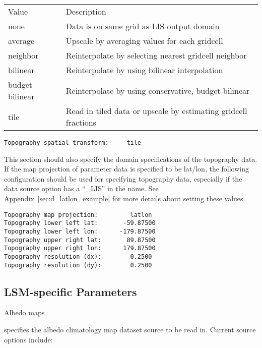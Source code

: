  \begin{tabular}{ll}
 Value     & Description                                         \\
 none      & Data is on same grid as LIS output domain            \\
 average   & Upscale by averaging values for each gridcell       \\
 neighbor  & Reinterpolate by selecting nearest gridcell neighbor \\
 bilinear  & Reinterpolate by using bilinear interpolation        \\
 budget-bilinear & Reinterpolate by using conservative, budget-bilinear \\
 tile      &  Read in tiled data or upscale by estimating gridcell
              fractions                                            \\
 \end{tabular}
 

 \begin{Verbatim}[frame=single]
Topography spatial transform:     tile
 \end{Verbatim}

 
 This section should also specify the domain specifications of the
 topography data.
 If the map projection of parameter data is specified to be lat/lon,
 the following configuration should be used for specifying topography
 data, especially if the data source option has a ``\_LIS'' in the name.
 See Appendix~\ref{sec:d_latlon_example} for more details about
 setting these values.
 

 \begin{Verbatim}[frame=single]
Topography map projection:         latlon
Topography lower left lat:       -59.87500
Topography lower left lon:      -179.87500
Topography upper right lat:       89.87500
Topography upper right lon:      179.87500
Topography resolution (dx):        0.2500
Topography resolution (dy):        0.2500
 \end{Verbatim}


 
 \subsection{LSM-specific Parameters} \label{ssec:lsmspecparams}
 


 
 Albedo maps

  specifies the albedo climatology map
 dataset source to be read in. Current source options include:

